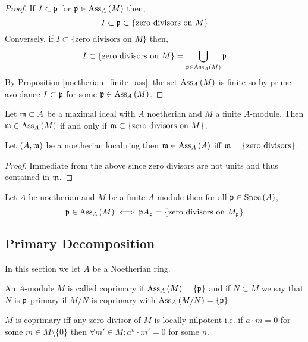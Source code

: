 \documentclass[12pt]{article}
\begin{document}
\begin{proof}
If $I \subset \mathfrak{p}$ for $\mathfrak{p} \in \mathrm{Ass}_{A}\left( M \right)$ then,
\[ I \subset \mathfrak{p}  \subset \{ \text{zero divisors on } M \} \]
Conversely, if $I \subset \{\text{zero divisors on } M\}$ then,
\[ I \subset \{ \text{zero divisors on } M \} = \bigcup_{\mathfrak{p} \in \mathrm{Ass}_{A}\left( M \right)} \mathfrak{p} \]
By Proposition \ref{noetherian_finite_ass}, the set $\mathrm{Ass}_{A}\left( M \right)$ is finite so by prime avoidance $I \subset \mathfrak{p}$ for some $\mathfrak{p} \in \mathrm{Ass}_{A}\left( M \right)$. 
\end{proof}

\begin{cor}
Let $\mathfrak{m} \subset A$ be a maximal ideal with $A$ noetherian and $M$ a finite $A$-module. Then $\mathfrak{m} \in \mathrm{Ass}_{A}\left( M \right)$ if and only if $\mathfrak{m} \subset \{ \text{zero divisors on } M\}$.
\end{cor}

\begin{cor}
Let $(A, \mathfrak{m})$ be a noetherian local ring then $\mathfrak{m} \in \mathrm{Ass}_{A}\left( A \right)$ iff $\mathfrak{m} = \{ \text{zero divisors} \}$.
\end{cor}

\begin{proof}
Immediate from the above since zero divisors are not units and thus contained in $\mathfrak{m}$.
\end{proof}


\begin{cor}
Let $A$ be noetherian and $M$ be a finite $A$-module then for all $\mathfrak{p} \in \mathrm{Spec}\left( A \right)$,
\[ \mathfrak{p} \in \mathrm{Ass}_{A}\left( M \right) \iff \mathfrak{p} A_{\mathfrak{p}} = \{ \text{zero divisors on } M_{\mathfrak{p}} \} \]
\end{cor}

\subsection{Primary Decomposition}

\begin{rmk}
In this section we let $A$ be a Noetherian ring.
\end{rmk}

\begin{definition}
An $A$-module $M$ is called coprimary if $\mathrm{Ass}_{A}\left( M \right) = \{\mathfrak{p}\}$ and if $N \subset M$ we say that $N$ is $\mathfrak{p}$-primary if $M / N$ is coprimary with $\mathrm{Ass}_{A}\left( M/N \right) = \{ \mathfrak{p} \}$.  
\end{definition}

\begin{lemma}
$M$ is coprimary iff any zero divisor of $M$ is locally nilpotent i.e. if $a \cdot m = 0$ for some $m \in M \setminus \{0\}$ then $\forall m' \in M : a^n \cdot m' = 0$ for some $n$. 
\end{lemma}
\end{document}
